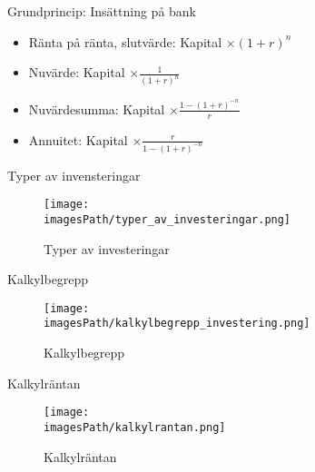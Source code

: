 \documentclass{article}
\newcommand{\imagesPath}{images}
\begin{document}
Grundprincip: Insättning på bank
\begin{itemize}
    \item Ränta på ränta, slutvärde: Kapital $\times (1+r)^n$
    \item Nuvärde: Kapital $\times \frac{1}{(1+r)^n}$
    \item Nuvärdesumma: Kapital $\times \frac{1-(1+r)^{-n}}{r}$
    \item Annuitet: Kapital $\times \frac{r}{1-(1+r)^{-n}}$
\end{itemize}

Typer av invensteringar
\begin{figure}[!h]
    \centering
    \texttt{[image: \\imagesPath/typer\_av\_investeringar.png]}
    \caption{Typer av investeringar}
\end{figure}

Kalkylbegrepp
\begin{figure}[!h]
    \centering
    \texttt{[image: \\imagesPath/kalkylbegrepp\_investering.png]}
    \caption{Kalkylbegrepp}
\end{figure}

Kalkylräntan
\begin{figure}[!h]
    \centering
    \texttt{[image: \\imagesPath/kalkylrantan.png]}
    \caption{Kalkylräntan}
\end{figure}
\end{document}
